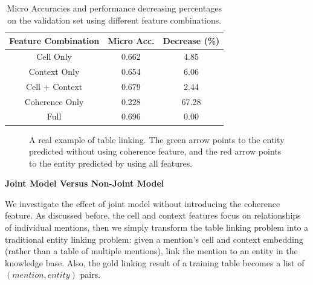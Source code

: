 \begin{table}[ht]
    \centering
    \caption{Micro Accuracies and performance decreasing percentages
             on the validation set using different feature combinations.}
    \label{tab:ablation-features}
    \begin{tabular} {c|c|c}
        Feature Combination &   Micro Acc.  & Decrease (\%) \\
        \hline
        Cell Only           &   0.662    & 4.85 \\
        Context Only        &   0.654    & 6.06   \\
        Cell + Context      &   0.679    & 2.44    \\
        Coherence Only      &   0.228    & 67.28     \\
        \hline
        Full                &   0.696    & 0.00  \\
    \end{tabular}
\end{table}



\begin{figure}[th]
\centering
\caption{A real example of table linking. The green arrow points to the entity 
predicted without using coherence feature, and the red arrow points to the entity
predicted by using all features.}
\label{fig:example}
\end{figure}


\noindent
\textbf{Joint Model Versus Non-Joint Model}

We investigate the effect of joint model without introducing the coherence feature.
As discussed before, the cell and context features focus on relationships of individual mentions,
then we simply transform the table linking problem into a traditional entity linking problem:
given a mention's cell and context embedding (rather than a table of multiple mentions),
link the mention to an entity in the knowledge base.
Also, the gold linking result of a training table becomes a list of $(mention, entity)$ pairs.

